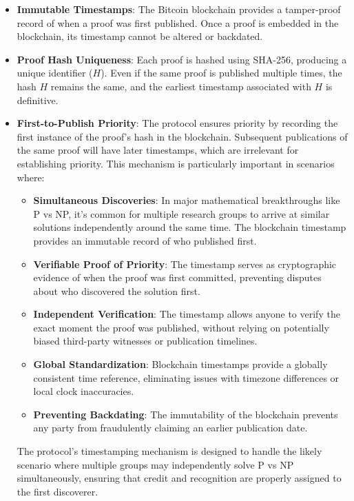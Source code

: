 \documentclass[12pt]{report}
\begin{document}
\begin{itemize}
    \item \textbf{Immutable Timestamps}: The Bitcoin blockchain provides a tamper-proof record of when a proof was first published. Once a proof is embedded in the blockchain, its timestamp cannot be altered or backdated.
    \item \textbf{Proof Hash Uniqueness}: Each proof is hashed using SHA-256, producing a unique identifier (\( H \)). Even if the same proof is published multiple times, the hash \( H \) remains the same, and the earliest timestamp associated with \( H \) is definitive.
    \item \textbf{First-to-Publish Priority}: The protocol ensures priority by recording the first instance of the proof's hash in the blockchain. Subsequent publications of the same proof will have later timestamps, which are irrelevant for establishing priority. This mechanism is particularly important in scenarios where:
    \begin{itemize}
        \item \textbf{Simultaneous Discoveries}: In major mathematical breakthroughs like P vs NP, it's common for multiple research groups to arrive at similar solutions independently around the same time. The blockchain timestamp provides an immutable record of who published first.
        \item \textbf{Verifiable Proof of Priority}: The timestamp serves as cryptographic evidence of when the proof was first committed, preventing disputes about who discovered the solution first.
        \item \textbf{Independent Verification}: The timestamp allows anyone to verify the exact moment the proof was published, without relying on potentially biased third-party witnesses or publication timelines.
        \item \textbf{Global Standardization}: Blockchain timestamps provide a globally consistent time reference, eliminating issues with timezone differences or local clock inaccuracies.
        \item \textbf{Preventing Backdating}: The immutability of the blockchain prevents any party from fraudulently claiming an earlier publication date.
    \end{itemize}
    The protocol's timestamping mechanism is designed to handle the likely scenario where multiple groups may independently solve P vs NP simultaneously, ensuring that credit and recognition are properly assigned to the first discoverer.
\end{itemize}
\end{document}
